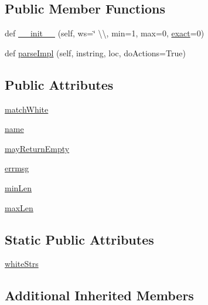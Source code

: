 \subsection*{Public Member Functions}
\begin{DoxyCompactItemize}
\item 
def \hyperlink{classpip_1_1__vendor_1_1pyparsing_1_1White_a3e83bcc290ba3a375101c16286a9a312}{\+\_\+\+\_\+init\+\_\+\+\_\+} (self, ws=\char`\"{} \textbackslash{}\textbackslash{}, min=1, max=0, \hyperlink{namespacepip_1_1__vendor_1_1pyparsing_a42c1593fb4acbba6a25348303fae2aa1}{exact}=0)
\item 
def \hyperlink{classpip_1_1__vendor_1_1pyparsing_1_1White_a4e1e1af202fa7f7e26792b3e4284043f}{parse\+Impl} (self, instring, loc, do\+Actions=True)
\end{DoxyCompactItemize}
\subsection*{Public Attributes}
\begin{DoxyCompactItemize}
\item 
\hyperlink{classpip_1_1__vendor_1_1pyparsing_1_1White_a5b4f16ee052c3eb984b108ea500d6c0e}{match\+White}
\item 
\hyperlink{classpip_1_1__vendor_1_1pyparsing_1_1White_ab9a0026c168bfc6f3ca6cbd9fbd044e0}{name}
\item 
\hyperlink{classpip_1_1__vendor_1_1pyparsing_1_1White_acd9bf37a84f0e62da879fd58555fef77}{may\+Return\+Empty}
\item 
\hyperlink{classpip_1_1__vendor_1_1pyparsing_1_1White_a03b046299cc6e396c7fcd8da6c402ec6}{errmsg}
\item 
\hyperlink{classpip_1_1__vendor_1_1pyparsing_1_1White_accf54fcaad3525ed21455f93009bfc97}{min\+Len}
\item 
\hyperlink{classpip_1_1__vendor_1_1pyparsing_1_1White_a24ea0a28c6dadf421745b193de78625f}{max\+Len}
\end{DoxyCompactItemize}
\subsection*{Static Public Attributes}
\begin{DoxyCompactItemize}
\item 
\hyperlink{classpip_1_1__vendor_1_1pyparsing_1_1White_ab6380150036c0f1eeb382fa82f490a84}{white\+Strs}
\end{DoxyCompactItemize}
\subsection*{Additional Inherited Members}


